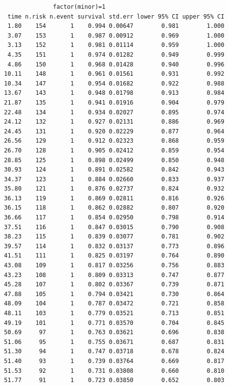 \documentclass[11pt]{article}
\begin{document}
\begin{verbatim}
                factor(minor)=1 
   time n.risk n.event survival std.err lower 95% CI upper 95% CI
   1.80    154       1    0.994 0.00647        0.981        1.000
   3.07    153       1    0.987 0.00912        0.969        1.000
   3.13    152       1    0.981 0.01114        0.959        1.000
   4.35    151       1    0.974 0.01282        0.949        0.999
   4.86    150       1    0.968 0.01428        0.940        0.996
  10.11    148       1    0.961 0.01561        0.931        0.992
  10.34    147       1    0.954 0.01682        0.922        0.988
  13.67    143       1    0.948 0.01798        0.913        0.984
  21.87    135       1    0.941 0.01916        0.904        0.979
  22.48    134       1    0.934 0.02027        0.895        0.974
  24.12    132       1    0.927 0.02131        0.886        0.969
  24.45    131       1    0.920 0.02229        0.877        0.964
  26.56    129       1    0.912 0.02323        0.868        0.959
  26.70    128       1    0.905 0.02412        0.859        0.954
  28.85    125       1    0.898 0.02499        0.850        0.948
  30.93    124       1    0.891 0.02582        0.842        0.943
  34.37    123       1    0.884 0.02660        0.833        0.937
  35.80    121       1    0.876 0.02737        0.824        0.932
  36.13    119       1    0.869 0.02811        0.816        0.926
  36.15    118       1    0.862 0.02882        0.807        0.920
  36.66    117       1    0.854 0.02950        0.798        0.914
  37.51    116       1    0.847 0.03015        0.790        0.908
  38.23    115       1    0.839 0.03077        0.781        0.902
  39.57    114       1    0.832 0.03137        0.773        0.896
  41.51    111       1    0.825 0.03197        0.764        0.890
  43.08    109       1    0.817 0.03256        0.756        0.883
  43.23    108       1    0.809 0.03313        0.747        0.877
  45.28    107       1    0.802 0.03367        0.739        0.871
  47.88    105       1    0.794 0.03421        0.730        0.864
  48.09    104       1    0.787 0.03472        0.721        0.858
  48.11    103       1    0.779 0.03521        0.713        0.851
  49.19    101       1    0.771 0.03570        0.704        0.845
  50.69     97       1    0.763 0.03621        0.696        0.838
  51.06     95       1    0.755 0.03671        0.687        0.831
  51.30     94       1    0.747 0.03718        0.678        0.824
  51.40     93       1    0.739 0.03764        0.669        0.817
  51.53     92       1    0.731 0.03808        0.660        0.810
  51.77     91       1    0.723 0.03850        0.652        0.803

\end{verbatim}
\end{document}
